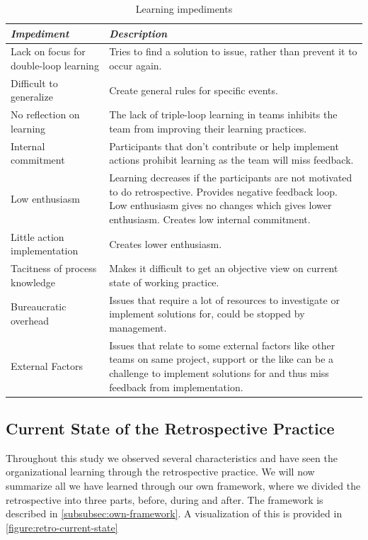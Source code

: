 \begin{table}[h]
	\begin{center}
		\caption{Learning impediments}
		\label{table:learning-impediments}
		\begin{tabular}{p{} p{}}
			\hline
			\textit{Impediment} & \textit{Description} \\
			\hline
			Lack on focus for double-loop learning & Tries to find a solution to issue, rather than prevent it to occur again. \\
			Difficult to generalize & Create general rules for specific events. \\
			No reflection on learning & The lack of triple-loop learning in teams inhibits the team from improving their learning practices. \\
			Internal commitment & Participants that don't contribute or help implement actions prohibit learning as the team will miss feedback. \\ 
			Low enthusiasm & Learning decreases if the participants are not motivated to do retrospective. Provides negative feedback loop. Low enthusiasm gives no changes which gives lower enthusiasm. Creates low internal commitment. \\
			Little action implementation & Creates lower enthusiasm. \\
			Tacitness of process knowledge & Makes it difficult to get an objective view on current state of working practice. \\
			Bureaucratic overhead & Issues that require a lot of resources to investigate or implement solutions for, could be stopped by management. \\
			External Factors & Issues that relate to some external factors like other teams on same project, support or the like can be a challenge to implement solutions for and thus miss feedback from implementation.\\
			\hline
		\end{tabular}
	\end{center}
\end{table}

\subsection{Current State of the Retrospective Practice}
Throughout this study we observed several characteristics and have seen the organizational learning through the retrospective practice. We will now summarize all we have learned through our own framework, where we divided the retrospective into three parts, before, during and after. The framework is described in \autoref{subsubsec:own-framework}. A visualization of this is provided in \autoref{figure:retro-current-state}

